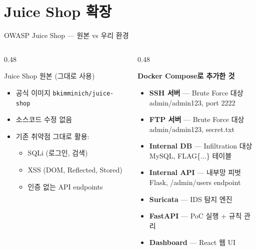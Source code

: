 \documentclass[aspectratio=169,10pt]{beamer}
\newcommand{\hlt}[1]{\textcolor{accent}{\textbf{#1}}}
\begin{document}
\section{Juice Shop 확장}

\begin{frame}{OWASP Juice Shop — 원본 vs 우리 환경}
\begin{columns}[T]
\begin{column}{0.48\textwidth}
\begin{block}{Juice Shop 원본 (그대로 사용)}
\begin{itemize}
    \item 공식 이미지 \texttt{bkimminich/juice-shop}
    \item 소스코드 수정 없음
    \item 기존 취약점 그대로 활용:
    \begin{itemize}
        \item SQLi (로그인, 검색)
        \item XSS (DOM, Reflected, Stored)
        \item 인증 없는 API endpoints
    \end{itemize}
\end{itemize}
\end{block}
\end{column}
\begin{column}{0.48\textwidth}
\begin{block}{\hlt{Docker Compose로 추가한 것}}
\begin{itemize}
    \item \textbf{SSH 서버} — Brute Force 대상\\
          {\scriptsize admin/admin123, port 2222}
    \item \textbf{FTP 서버} — Brute Force 대상\\
          {\scriptsize admin/admin123, secret.txt}
    \item \textbf{Internal DB} — Infiltration 대상\\
          {\scriptsize MySQL, FLAG\{...\} 테이블}
    \item \textbf{Internal API} — 내부망 피벗\\
          {\scriptsize Flask, /admin/users endpoint}
    \item \textbf{Suricata} — IDS 탐지 엔진
    \item \textbf{FastAPI} — PoC 실행 + 규칙 관리
    \item \textbf{Dashboard} — React 웹 UI
\end{itemize}
\end{block}
\end{column}
\end{columns}
\end{frame}
\end{document}
